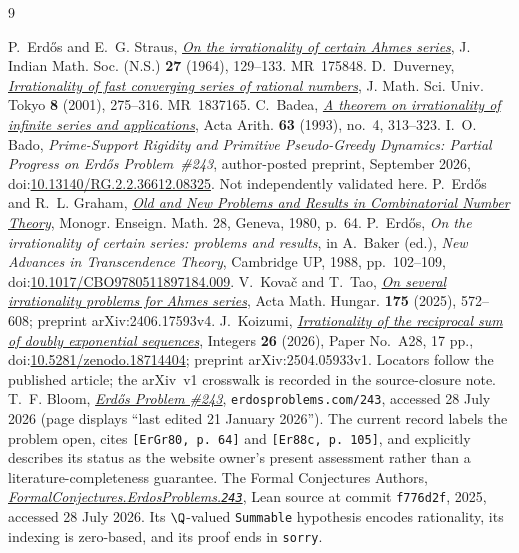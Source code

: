 \begin{thebibliography}{9}
\small
\raggedright
\setlength{\itemsep}{0pt}
 P.~Erd\H{o}s and E.~G. Straus,
  \href{https://users.renyi.hu/~p_erdos/1964-19.pdf}{\emph{On the irrationality
  of certain Ahmes series}},
  J. Indian Math. Soc. (N.S.) \textbf{27} (1964), 129--133. MR~175848.
 D.~Duverney,
  \href{https://www.ms.u-tokyo.ac.jp/journal/pdf/jms080206.pdf}
  {\emph{Irrationality of fast converging series of rational numbers}},
  J. Math. Sci. Univ. Tokyo \textbf{8} (2001), 275--316. MR~1837165.
 C.~Badea,
  \href{https://matwbn.icm.edu.pl/ksiazki/aa/aa63/aa6342.pdf}{\emph{A theorem
  on irrationality of infinite series and applications}}, Acta Arith.
  \textbf{63} (1993), no.~4, 313--323.
 I.~O. Bado,
  \emph{Prime-Support Rigidity and Primitive Pseudo-Greedy Dynamics:
  Partial Progress on Erd\H{o}s Problem~\#243}, author-posted preprint,
  September 2026, doi:\href{https://doi.org/10.13140/RG.2.2.36612.08325}
  {10.13140/RG.2.2.36612.08325}.  Not independently validated here.
 P.~Erd\H{o}s and R.~L. Graham,
  \href{https://mathweb.ucsd.edu/~ronspubs/80_11_number_theory.pdf}{\emph{Old
  and New Problems and Results in Combinatorial Number Theory}},
  Monogr. Enseign. Math. 28, Geneva, 1980, p.~64.
 P.~Erd\H{o}s, \emph{On the irrationality of certain series:
  problems and results}, in A.~Baker (ed.), \emph{New Advances in Transcendence
  Theory}, Cambridge UP, 1988, pp.~102--109,
  doi:\href{https://doi.org/10.1017/CBO9780511897184.009}{10.1017/CBO9780511897184.009}.
 V.~Kova\v{c} and T.~Tao,
  \href{https://arxiv.org/abs/2406.17593}{\emph{On several irrationality
  problems for Ahmes series}}, Acta Math. Hungar. \textbf{175} (2025),
  572--608; preprint arXiv:2406.17593v4.
 J.~Koizumi,
  \href{https://math.colgate.edu/~integers/aa28/aa28.pdf}
  {\emph{Irrationality of the reciprocal sum of doubly exponential sequences}},
  Integers \textbf{26} (2026), Paper No.~A28, 17 pp.,
  doi:\href{https://doi.org/10.5281/zenodo.18714404}{10.5281/zenodo.18714404};
  preprint arXiv:2504.05933v1.  Locators follow the published article;
  the arXiv~v1 crosswalk is recorded in the source-closure note.
 T.~F. Bloom,
  \href{https://www.erdosproblems.com/243}{\emph{Erd\H{o}s Problem \#243}},
  \texttt{erdosproblems.com/243}, accessed 28 July 2026 (page displays
  ``last edited 21 January 2026'').  The current record labels the problem
  open, cites \texttt{[ErGr80, p.~64]} and \texttt{[Er88c, p.~105]}, and
  explicitly describes its status as the website owner's present assessment
  rather than a literature-completeness guarantee.
 The Formal Conjectures Authors,
  \href{https://github.com/google-deepmind/formal-conjectures/blob/f776d2f2039351b00737ffcafb9d7d7666e1d9af/FormalConjectures/ErdosProblems/243.lean}
  {\emph{FormalConjectures.ErdosProblems.\texttt{243}}},
  Lean source at commit \texttt{f776d2f}, 2025, accessed 28 July 2026.
  Its $\Q$-valued \texttt{Summable} hypothesis encodes rationality, its
  indexing is zero-based, and its proof ends in \texttt{sorry}.
\end{thebibliography}


